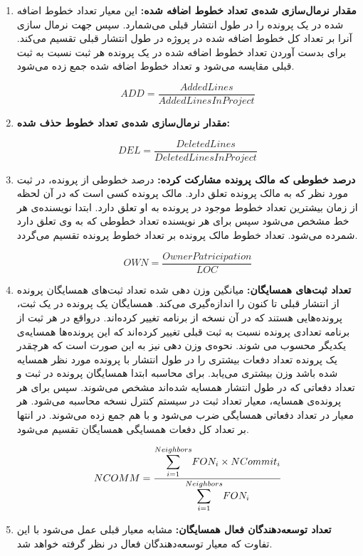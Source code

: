 \begin{enumerate}

	\item
	\textbf{مقدار نرمال‌سازی شده‌ی تعداد خطوط اضافه شده:}
	این معیار تعداد خطوط اضافه شده در یک پرونده را در طول انتشار قبلی می‌شمارد. سپس جهت نرمال سازی آنرا بر تعداد کل خطوط اضافه شده در پروژه در طول انتشار قبلی تقسیم می‌کند. برای بدست آوردن تعداد خطوط اضافه شده در یک پرونده هر ثبت نسبت به ثبت قبلی مقایسه می‌شود و تعداد خطوط اضافه شده جمع زده می‌شود.
\begin{latin}
\[
ADD = \frac{AddedLines}{AddedLinesInProject}
\]
\end{latin}
	
	\item
	\textbf{مقدار نرمال‌سازی شده‌ی تعداد خطوط حذف شده:}

\begin{latin}
	\[
	DEL = \frac{DeletedLines}{DeletedLinesInProject}
	\]
\end{latin}
	\item
	\textbf{درصد خطوطی که مالک پرونده مشارکت کرده:}
	درصد خطوطی  از پرونده، در  ثبت مورد نظر  که به مالک پرونده تعلق دارد. مالک پرونده کسی است که در آن لحظه از زمان بیشترین تعداد خطوط موجود در پرونده به او تعلق دارد. ابتدا نویسنده‌ی هر خط مشخص می‌شود سپس برای هر نویسنده تعداد خطوطی که به وی تعلق دارد شمرده می‌شود. تعداد خطوط مالک پرونده بر تعداد خطوط پرونده تقسیم می‌گردد.
	\begin{latin}
		\[
		OWN = \frac{OwnerPatricipation}{LOC}
		\]
	\end{latin}

	\item
	\textbf{تعداد ثبت‌های همسایگان:}
	میانگین وزن دهی شده تعداد ثبت‌های همسایگان پرونده از انتشار قبلی تا کنون را اندازه‌گیری می‌کند. همسایگان یک پرونده در یک ثبت، پرونده‌هایی هستند که در آن نسخه از برنامه تغییر کرده‌اند. در‌واقع در هر ثبت از برنامه تعدادی پرونده نسبت به ثبت قبلی تغییر کرده‌اند که این پرونده‌ها همسایه‌ی یکدیگر محسوب می شوند. نحوه‌ی وزن دهی نیز به این صورت است که هرچقدر یک پرونده تعداد دفعات بیشتری را در طول انتشار با پرونده مورد نظر همسایه شده باشد وزن بیشتری می‌یابد. برای محاسبه ابتدا همسایگان پرونده در ثبت  و تعداد دفعاتی که  در طول انتشار همسایه شده‌اند مشخص می‌شوند. سپس برای هر پرونده‌ی همسایه، معیار تعداد ثبت در سیستم کنترل نسخه محاسبه می‌شود. هر معیار در تعداد دفعاتی همسایگی ضرب می‌شود و با هم جمع زده می‌شوند. در انتها بر تعداد کل دفعات همسایگی همسایگان تقسیم می‌شود. 
\begin{latin}
\[
NCOMM = \frac{\mathlarger{\sum}\limits_{i=1}^{Neighbors} FON_i \times NCommit_i}{\mathlarger{\sum}\limits_{i=1}^{Neighbors}FON_i}
\]
\end{latin}
	\item
	\textbf{تعداد توسعه‌دهندگان فعال همسایگان:}
	مشابه معیار قبلی عمل می‌شود با این تفاوت که معیار توسعه‌دهندگان فعال در نظر گرفته خواهد شد.
	

\end{enumerate}
